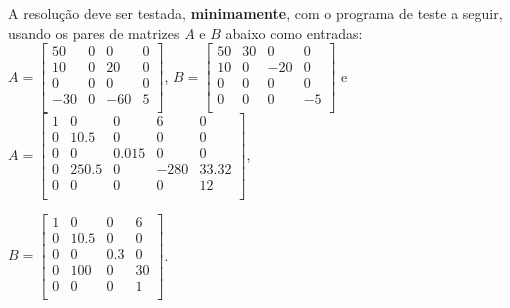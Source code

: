 \documentclass[a4paper,10pt]{article}
\begin{document}
A resolução deve ser testada, \textbf{minimamente}, com o programa de teste a seguir, usando os pares de matrizes $A$ e $B$ abaixo como entradas:
\\
$A = \begin{bmatrix}
50 & 0 & 0 & 0 \\
10 & 0 & 20 & 0 \\
0 & 0 & 0 & 0 \\
-30 & 0 & -60 & 5 \\
\end{bmatrix}$,
$
B = \begin{bmatrix}
50 & 30 & 0 & 0 \\
10 & 0 & -20 & 0 \\
0 & 0 & 0 & 0 \\
0 & 0 & 0 & -5 \\
\end{bmatrix}
$ e
\\
$A = \begin{bmatrix}
1 & 0 & 0 & 6 & 0 \\
0 & 10.5 & 0 & 0 & 0 \\
0 & 0 & 0.015 & 0 & 0 \\
0 & 250.5 & 0 & -280 & 33.32 \\
0 & 0 & 0 & 0 & 12 \\
\end{bmatrix}$,

$B = \begin{bmatrix}
1 & 0 & 0 & 6 \\
0 & 10.5 & 0 & 0 \\
0 & 0 & 0.3 & 0 \\
0 & 100 & 0 & 30 \\
0 & 0 & 0 & 1 \\
\end{bmatrix}
$.
\end{document}
